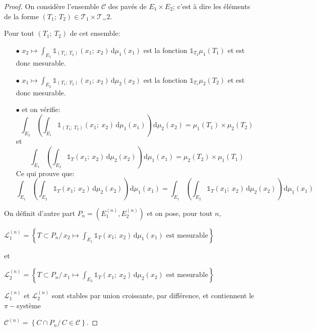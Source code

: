 \begin{proof}
On considère l'ensemble $\mathcal{C}$ des pavés de $E_1 \times E_2$; c'est à dire les éléments de la forme $(T_1;~T_2) \in \mathcal{T}_1 \times \mathcal{T}_=2$. 

Pour tout $(T_1;~T_2)$ de cet ensemble:
\begin{itemize}
\item[$\bullet$]  $x_2 \mapsto \displaystyle{\int_{E_1}} \displaystyle{\mathbb{1}}_{(T_1;~T_2)}(x_1;~x_2)  \,   \mathrm d \mu_1(x_1)$ est la fonction $\mathbb{1}_{T_2} \mu_1(T_1)$ et est donc mesurable.
\item[$\bullet$]  $x_1 \mapsto \displaystyle{\int_{E_2}} \displaystyle{\mathbb{1}}_{(T_1;~T_2)}(x_1;~x_2)  \, \mathrm d \mu_2(x_2)$ est la fonction $\mathbb{1}_{T_1} \mu_2(T_2)$ et est donc mesurable.
\item[$\bullet$]  et on vérifie:
\[
\displaystyle{\int_{E_2}} \left(\displaystyle{\int_{E_1}} \displaystyle{\mathbb{1}}_{(T_1;~T_2)}(x_1;~x_2)  \, \mathrm d \mu_1(x_1)\right)  \, \mathrm d \mu_2(x_2) = \mu_1(T_1) \times \mu_2(T_2)
\]
et 
\[
\displaystyle{\int_{E_1}} \left(\displaystyle{\int_{E_2}} \displaystyle{\mathbb{1}}_{T}(x_1;~x_2)  \,  \mathrm d \mu_2(x_2)\right)  \, \mathrm d \mu_1(x_1) = \mu_2(T_2) \times \mu_1(T_1) 
\]
Ce qui prouve que:
\[
\displaystyle{\int_{E_1}} \left(\displaystyle{\int_{E_2}} \displaystyle{\mathbb{1}}_{T}(x_1;~x_2)  \, \mathrm d \mu_2(x_2)\right)  \, \mathrm d \mu_1(x_1) = \displaystyle{\int_{E_1}} \left(\displaystyle{\int_{E_2}} \displaystyle{\mathbb{1}}_{T}(x_1;~x_2)  \, \mathrm d \mu_2(x_2)\right) \,  \mathrm d \mu_1(x_1)
\]
\end{itemize}

On définit d'autre part $P_n = (E_1^{(n)}, E_2^{(n)})$ et on pose, pour tout $n$, 

$\mathcal{L}_1^{(n)}=\left\{ T \subset P_n/ \, x_2 \mapsto \displaystyle{\int_{E_1}} \displaystyle{\mathbb{1}}_{T}(x_1;~x_2)  \, \mathrm d \mu_1(x_1) \text{ est mesurable}\right \}$

et

$\mathcal{L}_2^{(n)}=\left\{ T \subset P_n/ \, x_1 \mapsto \displaystyle{\int_{E_2}} \displaystyle{\mathbb{1}}_{T}(x_1;~x_2)  \, \mathrm d \mu_2(x_2) \text{ est mesurable}\right \}$

$\mathcal{L}_1^{(n)}$ et $\mathcal{L}_2^{(n)}$ sont stables par union croissante, par différence, et contiennent le $\pi-$système 

$\mathcal{C}^{(n)} = \left \{ C \cap P_n/ \, C \in \mathcal{C} \right \}$.


\end{proof}
